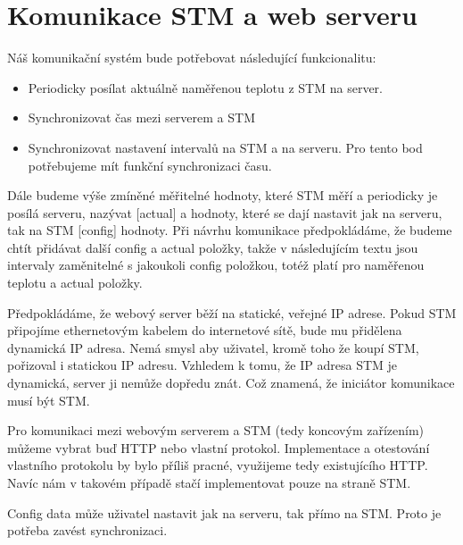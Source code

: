 \section{Komunikace STM a web serveru}

Náš komunikační systém bude potřebovat následující funkcionalitu:
\begin{itemize}
    \item Periodicky posílat aktuálně naměřenou teplotu z STM na server.
    \item Synchronizovat čas mezi serverem a STM
    \item Synchronizovat nastavení intervalů na STM a na serveru.
          Pro tento bod potřebujeme mít funkční synchronizaci času.
\end{itemize}

Dále budeme výše zmíněné měřitelné hodnoty, které STM měří a periodicky je posílá
serveru, nazývat [actual] a hodnoty, které se dají nastavit jak na serveru, tak na
STM [config] hodnoty.
Při návrhu komunikace předpokládáme, že budeme chtít přidávat další config a actual
položky, takže v následujícím textu jsou intervaly zaměnitelné s jakoukoli
config položkou, totéž platí pro naměřenou teplotu a actual položky.

Předpokládáme, že webový server běží na statické, veřejné IP adrese.
Pokud STM připojíme ethernetovým kabelem do internetové sítě, bude mu přidělena dynamická IP adresa.
Nemá smysl aby uživatel, kromě toho že koupí STM, pořizoval i statickou IP adresu.
Vzhledem k tomu, že IP adresa STM je dynamická, server ji nemůže dopředu znát.
Což znamená, že iniciátor komunikace musí být STM.

Pro komunikaci mezi webovým serverem a STM (tedy koncovým zařízením) můžeme vybrat buď HTTP nebo vlastní protokol.
Implementace a otestování vlastního protokolu by bylo příliš pracné, využijeme tedy existujícího HTTP.
Navíc nám v takovém případě stačí implementovat pouze na straně STM.


Config data může uživatel nastavit jak na serveru, tak přímo na STM.
Proto je potřeba zavést synchronizaci.

